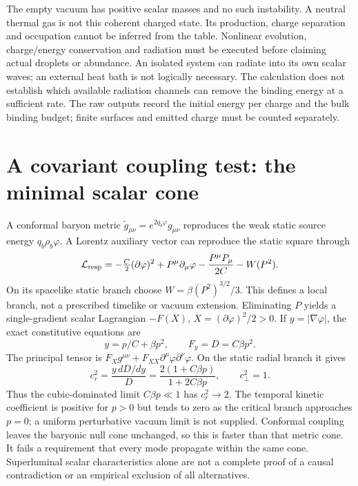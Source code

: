 \documentclass[11pt]{article}
\begin{document}
The empty vacuum has positive scalar masses and no such instability. A
neutral thermal gas is not this coherent charged state. Its production,
charge separation and occupation cannot be inferred from the table.
Nonlinear evolution, charge/energy conservation and radiation must be
executed before claiming actual droplets or abundance. An isolated system
can radiate into its own scalar waves; an external heat bath is not
logically necessary. The calculation does not establish which available
radiation channels can remove the binding energy at a sufficient rate.
The raw outputs record the initial energy per charge and the bulk binding
budget; finite surfaces and emitted charge must be counted separately.

\section{A covariant coupling test: the minimal scalar cone}
A conformal baryon metric $\widetilde g_{\mu\nu}=e^{2q_b\varphi}g_{\mu\nu}$
reproduces the weak static source energy $q_b\rho_b\varphi$. A Lorentz
auxiliary vector can reproduce the static square through
\begin{equation}
 \mathcal L_{\rm resp}=-\tfrac C2(\partial\varphi)^2
 +P^\mu\partial_\mu\varphi-\frac{P^\mu P_\mu}{2C}-W(P^2).
\end{equation}
On its spacelike static branch choose $W=\beta(P^2)^{3/2}/3$.
This defines a local branch, not a prescribed timelike or vacuum extension.
Eliminating $P$ yields a single-gradient scalar Lagrangian $-F(X)$,
$X=(\partial\varphi)^2/2>0$. If $y=|\nabla\varphi|$, the exact
constitutive equations are
\begin{equation}
 y=p/C+\beta p^2,\qquad F_y=D=C\beta p^2.
\end{equation}
The principal tensor is
$F_Xg^{\mu\nu}+F_{XX}\partial^\mu\varphi\partial^\nu\varphi$.
On the static radial branch it gives
\begin{equation}
 c_r^2=\frac{y\,dD/dy}{D}
 =\frac{2(1+C\beta p)}{1+2C\beta p},\qquad c_\perp^2=1.
 \label{qfg:cone}
\end{equation}
Thus the cubic-dominated limit $C\beta p\ll1$ has $c_r^2\to2$.
The temporal kinetic coefficient is positive for $p>0$ but tends to zero
as the critical branch approaches $p=0$; a uniform perturbative vacuum
limit is not supplied. Conformal coupling leaves the baryonic null cone
unchanged, so this is faster than that metric cone. It fails a requirement
that every mode propagate within the same cone. Superluminal scalar
characteristics alone are not a complete proof of a causal contradiction
or an empirical exclusion of all alternatives.
\end{document}
